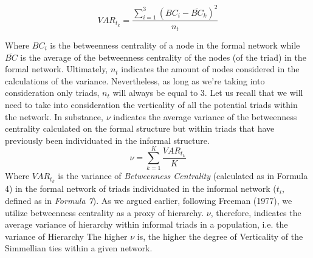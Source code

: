 \documentclass{article}
\begin{document}
\begin{equation}
{VAR}_{t_k}=\frac{\sum_{i=1}^3\left({BC_i}-{\overline{BC}}_k\right)^2}{n_t}
\end{equation}


 
Where ${BC_i}$ is the betweenness centrality of a node in the formal network while $\overline{BC}$ is the average of the betweenness centrality of the nodes (of the triad) in the formal network. Ultimately, $n_t$ indicates the amount of nodes considered in the calculations of the variance. Nevertheless, as long as we’re taking into consideration only triads, $n_t$ will always be equal to 3. Let us recall that we will need to take into consideration the verticality of all the potential triads within the network.
In substance, $\nu$ indicates the average variance  of the betweenness centrality calculated on the formal structure but within triads that have previously been individuated in the informal structure.
\begin{equation}
\nu=\sum_{k=1}^{K}\frac{{VAR}_{t_k}}{K}
\end{equation}
Where $VAR_{t_k}$ is the variance of \emph{Betweenness Centrality} (calculated as in Formula 4) in the formal network of triads individuated in the informal network ($t_i$, defined as in \emph{Formula 7}). 
As we argued earlier, following Freeman (1977), we utilize betweenness centrality as a proxy of hierarchy. $\nu$, therefore, indicates the average variance of hierarchy within informal triads in a population, i.e. the variance of Hierarchy 
The higher $\nu$ is, the higher the degree of Verticality of the Simmellian ties within a given network.
\end{document}
